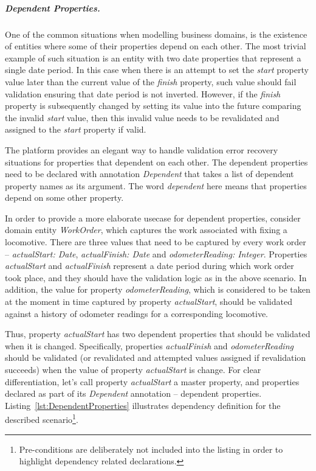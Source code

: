   \subparagraph*{Dependent Properties.}

  One of the common situations when modelling business domains, is the existence of entities where some of their properties depend on each other.
  The most trivial example of such situation is an entity with two date properties that represent a single date period.
  In this case when there is an attempt to set the \emph{start} property value later than the current value of the \emph{finish} property, such value should fail validation ensuring that date period is not inverted.
  However, if the \emph{finish} property is subsequently changed by setting its value into the future comparing the invalid \emph{start} value, then this invalid value needs to be revalidated and assigned to the \emph{start} property if valid.
  
  The platform provides an elegant way to handle validation error recovery situations for properties that dependent on each other. 
  The dependent properties need to be declared with annotation \emph{Dependent} that takes a list of dependent property names as its argument. 
  The word \emph{dependent} here means that properties depend on some other property. 
  
  In order to provide a more elaborate usecase for dependent properties, consider domain entity \emph{WorkOrder}, which captures the work associated with fixing a locomotive.
  There are three values that need to be captured by every work order -- \emph{actualStart: Date}, \emph{actualFinish: Date} and \emph{odometerReading: Integer}.
  Properties \emph{actualStart} and \emph{actualFinish} represent a date period during which work order took place, and they should have the validation logic as in the above scenario.
  In addition, the value for property \emph{odometerReading}, which is considered to be taken at the moment in time captured by property \emph{actualStart}, should be validated against a history of odometer readings for a corresponding locomotive.

  Thus, property \emph{actualStart} has two dependent properties that should be validated when it is changed.
  Specifically, properties \emph{actualFinish} and \emph{odometerReading} should be validated (or revalidated and attempted values assigned if revalidation succeeds) when the value of property \emph{actualStart} is change.
  For clear differentiation, let's call property \emph{actualStart} a master property, and properties declared as part of its \emph{Dependent} annotation -- dependent properties.
  Listing~\ref{lst:DependentProperties} illustrates dependency definition for the described scenario\footnote{Pre-conditions are deliberately not included into the listing in order to highlight dependency related declarations.}.

